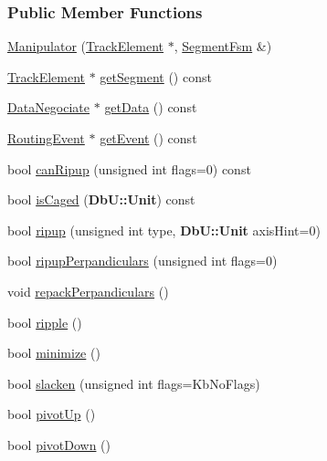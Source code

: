 \subsubsection*{Public Member Functions}
\begin{DoxyCompactItemize}
\item 
\hyperlink{classKite_1_1Manipulator_ac02c770e24b6ff747867adcb7c4da92e}{Manipulator} (\hyperlink{classKite_1_1TrackElement}{Track\-Element} $\ast$, \hyperlink{classKite_1_1SegmentFsm}{Segment\-Fsm} \&)
\item 
\hyperlink{classKite_1_1TrackElement}{Track\-Element} $\ast$ \hyperlink{classKite_1_1Manipulator_ad2d369e354ca1f9ff118851da69c7efc}{get\-Segment} () const 
\item 
\hyperlink{classKite_1_1DataNegociate}{Data\-Negociate} $\ast$ \hyperlink{classKite_1_1Manipulator_aabb85a33d14a70586f4a2ca2dee566f0}{get\-Data} () const 
\item 
\hyperlink{classKite_1_1RoutingEvent}{Routing\-Event} $\ast$ \hyperlink{classKite_1_1Manipulator_a279d639cfaa447720f30991496f706a0}{get\-Event} () const 
\item 
bool \hyperlink{classKite_1_1Manipulator_aa1b59e12dd58840e11e1056cab4261b7}{can\-Ripup} (unsigned int flags=0) const 
\item 
bool \hyperlink{classKite_1_1Manipulator_af977361f4d90967fec7fbf1e778d01bb}{is\-Caged} ({\bf Db\-U\-::\-Unit}) const 
\item 
bool \hyperlink{classKite_1_1Manipulator_a370b5a5373d3019510d4ec22f44c76c2}{ripup} (unsigned int type, {\bf Db\-U\-::\-Unit} axis\-Hint=0)
\item 
bool \hyperlink{classKite_1_1Manipulator_a147c24aa53f561c10d5d24b82b03448a}{ripup\-Perpandiculars} (unsigned int flags=0)
\item 
void \hyperlink{classKite_1_1Manipulator_a9721ea909a9b11297dea855e1ba82a55}{repack\-Perpandiculars} ()
\item 
bool \hyperlink{classKite_1_1Manipulator_af46102d49a7aa0c163de1bf143807794}{ripple} ()
\item 
bool \hyperlink{classKite_1_1Manipulator_aa61f08642d981761687635be108b9837}{minimize} ()
\item 
bool \hyperlink{classKite_1_1Manipulator_a82897c077e4c0d4281c3dce3e37ab997}{slacken} (unsigned int flags=Kb\-No\-Flags)
\item 
bool \hyperlink{classKite_1_1Manipulator_ad590137c4e7e8d5ad2a6f510e0d70e81}{pivot\-Up} ()
\item 
bool \hyperlink{classKite_1_1Manipulator_ac3b48ad16d9b9b63d1c68e526ceb42e8}{pivot\-Down} ()

\end{DoxyCompactItemize}

